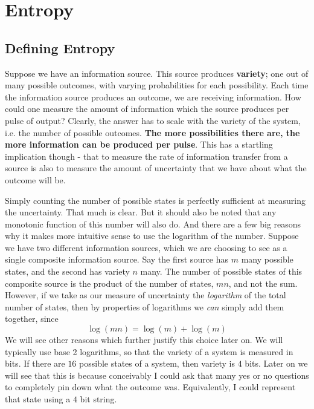 \section{Entropy}
\subsection{Defining Entropy}
\par Suppose we have an information source. This source produces \textbf{variety}; one out of many possible outcomes, with varying probabilities for each possibility. Each time the information source produces an outcome, we are receiving information. How could one measure the amount of information which the source produces per pulse of output? Clearly, the answer has to scale with the variety of the system, i.e. the number of possible outcomes. \textbf{The more possibilities there are, the more information can be produced per pulse}. This has a startling implication though - that to measure the rate of information transfer from a source is also to measure the amount of uncertainty that we have about what the outcome will be. \par 
Simply counting the number of possible states is perfectly sufficient at measuring the uncertainty. That much is clear. But it should also be noted that any monotonic function of this number will also do. And there are a few big reasons why it makes more intuitive sense to use the logarithm of the number. Suppose we have two different information sources, which we are choosing to see as a single composite information source. Say the first source has $m$ many possible states, and the second has variety $n$ many. The number of possible states of this composite source is the product of the number of states, $mn$, and not the sum. However, if we take as our measure of uncertainty the \emph{logarithm} of the total number of states, then by properties of logarithms we \emph{can} simply add them together, since
\[ \log(mn) = \log(m)+\log(m) \]
We will see other reasons which further justify this choice later on. We will typically use base 2 logarithms, so that the variety of a system is measured in bits. If there are $16$ possible states of a system, then variety is $4$ bits. Later on we will see that this is because conceivably I could ask that many yes or no questions to completely pin down what the outcome was. Equivalently, I could represent that state using a $4$ bit string. \par 
